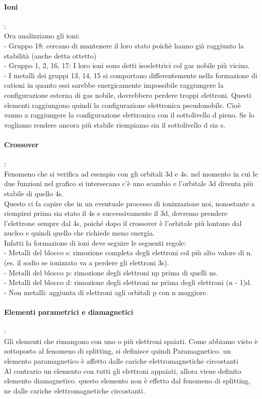 \paragraph*{Ioni}:\\
Ora analizziamo gli ioni:\\
\tab- Gruppo 18: cercano di mantenere il loro stato poichè hanno già raggiunto la stabilità (anche detta ottetto)\\
\tab- Gruppo 1, 2, 16, 17: I loro ioni sono detti isoelettrici col gas nobile più vicino.\\
\tab- I metalli dei gruppi 13, 14, 15 si comportano differentemente nella formazione di cationi in quanto essi sarebbe energicamente impossibile raggiungere la configurazione esterna di gas nobile, dovrebbero perdere troppi elettroni. Questi elementi raggiungono quindi la configurazione elettronica pseudonobile. Cioè vanno a raggiungere la configurazione elettronica con il sottolivello d pieno. Se lo vogliamo rendere ancora più stabile riempiamo sia il sottolivello d sia s.\\
\paragraph*{Crossover}:\\
Fenomeno che si verifica ad esempio con gli orbitali 3d e 4s. nel momento in cui le due funzioni nel grafico si intersecano c’è uno scambio e l’orbitale 3d diventa più stabile di quello 4s.\\
Questo ci fa capire che in un eventuale processo di ionizzazione noi, nonostante a riempirsi prima sia stato il 4s e successivamente il 3d, dovremo prendere l’elettrone sempre dal 4s, poiché dopo il crossover è l’orbitale più lontano dal nucleo e quindi quello che richiede meno energia.\\
Infatti la formazione di ioni deve seguire le seguenti regole:\\
\tab- Metalli del blocco s: rimozione completa degli elettroni col più alto valore di n. (es. il sodio se ionizzato va a perdere gli elettroni 3s).\\
\tab- Metalli del blocco p: rimozione degli elettroni np prima di quelli ns.\\
\tab- Metalli del blocco d: rimozione degli elettroni ns prima degli elettroni (n - 1)d.\\
\tab- Non metalli: aggiunta di elettroni agli orbitali p con n maggiore.\\
\paragraph*{Elementi parametrici e diamagnetici}:\\
Gli elementi che rimangono con uno o più elettroni spaiati. Come abbiamo visto è sottoposto al fenomeno di splitting, si definisce quindi Paramagnetico. un elemento paramagnetico è affetto dalle cariche elettromagnetiche circostanti\\
Al contrario un elemento con tutti gli elettroni appaiati, allora viene definito elemento diamagnetico. questo elemento non è effetto dal fenomeno di splitting, ne dalle cariche elettromagnetiche circostanti.\\